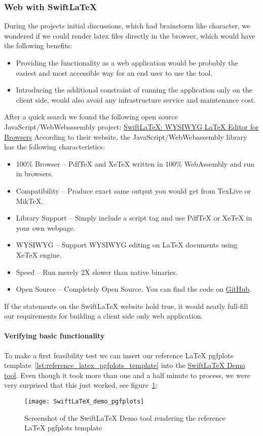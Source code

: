 \subsubsection{Web with SwiftLaTeX}
During the projects initial discussions, which had brainstorm like character, we wondered if we could render latex files directly in the browser, which would have the following benefits:
\begin{itemize}
    \item Providing the functionality as a web application would be probably the easiest and most accessible way for an end user to use the tool.
    \item Introducing the additional constraint of running the application only on the client side, would also avoid any infrastructure service and maintenance cost.
\end{itemize}
After a quick search we found the following open source JavaScript/WebWebassembly project: \href{https://www.SwiftLaTeX.com/}{SwiftLaTeX: WYSIWYG LaTeX Editor for Browsers}
According to their website, the JavaScript/WebWebassembly library has the following characteristics:~\cite{SwiftLaTeX_website}
\begin{itemize}
    \item 100\% Browser – PdfTeX and XeTeX written in 100\% WebAssembly and run in browsers.
    \item Compatibility – Produce exact same output you would get from TexLive or MikTeX\@.
    \item Library Support – Simply include a script tag and use PdfTeX or XeTeX in your own webpage.
    \item WYSIWYG – Support WYSIWYG editing on LaTeX documents using XeTeX engine.
    \item Speed – Run merely 2X slower than native binaries.
    \item Open Source – Completely Open Source. You can find the code on \href{https://github.com/SwiftLaTeX/SwiftLaTeX/}{GitHub}.
\end{itemize}
If the statements on the SwiftLaTeX website hold true, it would neatly full-fill our requirements for building a client side only web application.

\paragraph{Verifying basic functionality}\mbox{}\newline
To make a first feasibility test we can insert our reference LaTeX pgfplots template~\ref{lst:reference_latex_pgfplots_template} into the \href{https://www.SwiftLaTeX.com/\#demo}{SwiftLaTeX Demo tool}.
Even though it took more than one and a half minute to process, we were very surprised that this just worked, see figure~\ref{fig:SwiftLaTeX_demo_rendering_latex_pgfplots_template}:
\begin{figure}[H]
    \centering
    \texttt{[image: SwiftLaTeX\_demo\_pgfplots]}
    \caption{Screenshot of the SwiftLaTeX Demo tool rendering the reference LaTeX pgfplots template}\label{fig:SwiftLaTeX_demo_rendering_latex_pgfplots_template}
\end{figure}

